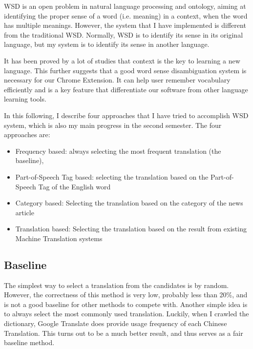 \documentclass[11pt]{article}
\begin{document}
WSD is an open problem in natural language processing and ontology, aiming at identifying the proper sense of a word (i.e. meaning) in a context, when the word has multiple meanings. However, the system that I have implemented is  different from the traditional WSD. Normally, WSD is to identify its sense in its original language, but my system is to identify its sense in another language.

It has been proved by a lot of studies that context is the key to learning a new language. This further suggests that a good word sense disambiguation system is necessary for our Chrome Extension. It can help user remember vocabulary efficiently and is a key feature that differentiate our software from other language learning tools.

In this following, I describe four approaches that I have tried to accomplish WSD system, which is also my main progress in the second semester. The four approaches are: 
\begin{itemize}
\item Frequency based: always selecting the most frequent translation (the baseline),
\item Part-of-Speech Tag based: selecting the translation based on the Part-of-Speech Tag of the English word
\item Category based: Selecting the translation based on the category of the news article
\item Translation based: Selecting the translation based on the result from existing Machine Translation systems
\end{itemize}

\subsection{Baseline}
The simplest way to select a translation from the candidates is by random. However, the correctness of this method is very low, probably less than 20\%, and is not a good baseline for other methods to compete with. Another simple idea is to always select the most commonly used translation. Luckily, when I crawled the dictionary, Google Translate does provide usage frequency of each Chinese Translation.  This turns out to be a much better result, and thus serves as a fair baseline method.
\\
\end{document}
